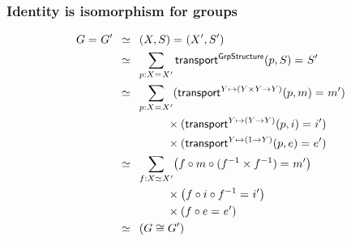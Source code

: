 \documentclass{beamer}
\newcommand{\constfont}[1]{\ensuremath{\mathsf{#1}}}
\newcommand{\GrpStructure}{\constfont{GrpStructure}}
\newcommand{\eqv}[2]{\ensuremath{#1 \simeq #2}\xspace}
\newcommand{\transfib}[3]{\ensuremath{\mathsf{transport}^{#1}(#2,#3)\xspace}}
\newcommand{\id}[3][]{\ensuremath{#2 =_{#1} #3}\xspace}
\theoremstyle{definition}
\begin{document}
\begin{frame}
 \frametitle{Identity is isomorphism for groups}
 \begin{align*}
   \id{G}{G'} \enspace
   & \simeq  \enspace \id{(X,S)}{(X',S')} \\
   & \simeq \enspace \sum_{p : \id{X}{X'}} \id{\transfib{\GrpStructure}{p}{S}}{S'} \\
   & \simeq \enspace \sum_{p : \id{X}{X'}} (\id{\transfib{Y \mapsto (Y \times Y \to Y)}{p}{m}}{m'})  \\
   &  \hspace{1.5cm} \times(\id{\transfib{Y \mapsto (Y \to Y)}{p}{i}}{i'}) \\
   & \hspace{1.5cm}  \times(\id{\transfib{Y \mapsto (1 \to Y)}{p}{e}}{e'}) \\
   & \simeq \enspace \sum_{f : \eqv{X}{X'}} \bigl(\id{f \circ m \circ (f^{-1} \times f^{-1})}{m'}\bigr)  \\
   &             \hspace{1.5cm}                            \times \bigl(\id{f \circ i \circ f^{-1}}{i'}\bigr) \\
   & \hspace{1.5cm}  \times(\id{f \circ e}{e'}) \\
   & \simeq \enspace  (G \cong G')
 \end{align*}



\end{frame}
\end{document}
